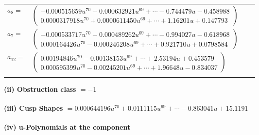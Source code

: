 \documentclass[1p]{elsarticle_modified}
\theoremstyle{definition}
\begin{document}
\begin{tabular}{m{7pt} m{180pt} m{7pt} m{180pt} }
\flushright $a_{8}=$&$\begin{pmatrix}-0.000515659 u^{70}+0.000632921 u^{69}+\cdots-0.744479 u-0.458988\\0.0000317918 u^{70}+0.0000611450 u^{69}+\cdots+1.16201 u+0.147793\end{pmatrix}$ \\
\flushright $a_{7}=$&$\begin{pmatrix}-0.000533717 u^{70}+0.000489262 u^{69}+\cdots-0.994027 u-0.618968\\0.000164426 u^{70}-0.000246208 u^{69}+\cdots+0.921710 u+0.0798584\end{pmatrix}$ \\
\flushright $a_{12}=$&$\begin{pmatrix}0.00194846 u^{70}-0.00138153 u^{69}+\cdots+2.53194 u+0.453579\\0.000595399 u^{70}-0.00245201 u^{69}+\cdots+1.96648 u-0.834037\end{pmatrix}$\\&\end{tabular}
\flushleft \textbf{(ii) Obstruction class $= -1$}\\~\\
\flushleft \textbf{(iii) Cusp Shapes $= 0.000644196 u^{70}+0.0111115 u^{69}+\cdots-0.863041 u+15.1191$}\\~\\
\newpage\renewcommand{\arraystretch}{1}
\flushleft \textbf{(iv) u-Polynomials at the component}\newline \\
\end{document}

